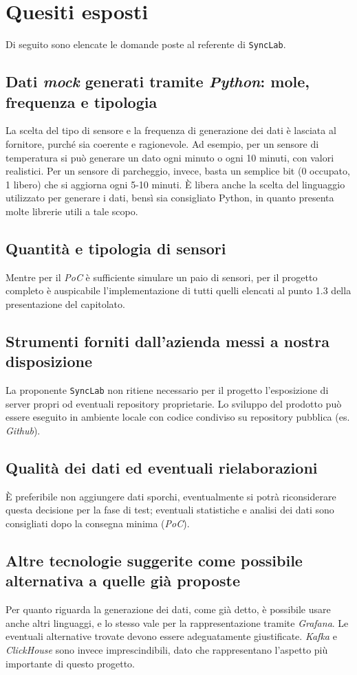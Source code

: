 \documentclass[8pt]{article}
\begin{document}
\section{Quesiti esposti}
Di seguito sono elencate le domande poste al referente di \texttt{SyncLab}.

\subsection{Dati \textit{mock} generati tramite \textit{Python}: mole, frequenza e tipologia}
La scelta del tipo di sensore e la frequenza di generazione dei dati è lasciata al fornitore, purché sia coerente e ragionevole. Ad esempio, per un sensore di temperatura si può generare un dato ogni minuto o ogni 10 minuti, con valori realistici. Per un sensore di parcheggio, invece, basta un semplice bit (0 occupato, 1 libero) che si aggiorna ogni 5-10 minuti. È libera anche la scelta del linguaggio utilizzato per generare i dati, bensì sia consigliato Python, in quanto presenta molte librerie utili a tale scopo.

\subsection{Quantità e tipologia di sensori}
Mentre per il \textit{PoC} è sufficiente simulare un paio di sensori, per il progetto completo è auspicabile l'implementazione di tutti quelli elencati al punto 1.3 della presentazione del capitolato.

\subsection{Strumenti forniti dall'azienda messi a nostra disposizione}
La proponente \texttt{SyncLab} non ritiene necessario per il progetto l'esposizione di server propri od eventuali repository proprietarie. Lo sviluppo del prodotto può essere eseguito in ambiente locale con codice condiviso su repository pubblica (es. \textit{Github}).

\subsection{Qualità dei dati ed eventuali rielaborazioni}
È preferibile non aggiungere dati sporchi, eventualmente si potrà riconsiderare questa decisione per la fase di test; eventuali statistiche e analisi dei dati sono consigliati dopo la consegna minima (\textit{PoC}).

\subsection{Altre tecnologie suggerite come possibile alternativa a quelle già proposte}
Per quanto riguarda la generazione dei dati, come già detto, è possibile usare anche altri linguaggi, e lo stesso vale per la rappresentazione tramite \textit{Grafana}. Le eventuali alternative trovate devono essere adeguatamente giustificate. \textit{Kafka} e \textit{ClickHouse} sono invece imprescindibili, dato che rappresentano l'aspetto più importante di questo progetto.
\end{document}

